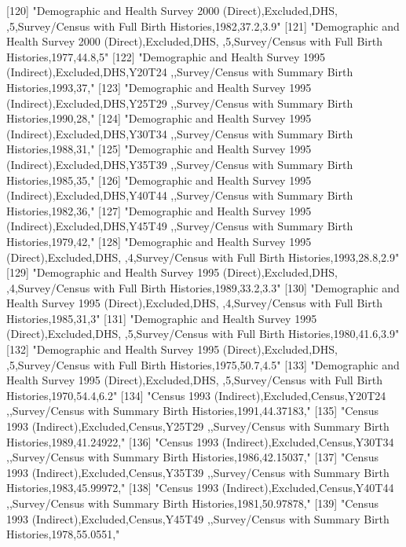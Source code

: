 [120] "Demographic and Health Survey 2000 (Direct),Excluded,DHS, ,5,Survey/Census with Full Birth Histories,1982,37.2,3.9"           
[121] "Demographic and Health Survey 2000 (Direct),Excluded,DHS, ,5,Survey/Census with Full Birth Histories,1977,44.8,5"             
[122] "Demographic and Health Survey 1995 (Indirect),Excluded,DHS,Y20T24 ,,Survey/Census with Summary Birth Histories,1993,37,"      
[123] "Demographic and Health Survey 1995 (Indirect),Excluded,DHS,Y25T29 ,,Survey/Census with Summary Birth Histories,1990,28,"      
[124] "Demographic and Health Survey 1995 (Indirect),Excluded,DHS,Y30T34 ,,Survey/Census with Summary Birth Histories,1988,31,"      
[125] "Demographic and Health Survey 1995 (Indirect),Excluded,DHS,Y35T39 ,,Survey/Census with Summary Birth Histories,1985,35,"      
[126] "Demographic and Health Survey 1995 (Indirect),Excluded,DHS,Y40T44 ,,Survey/Census with Summary Birth Histories,1982,36,"      
[127] "Demographic and Health Survey 1995 (Indirect),Excluded,DHS,Y45T49 ,,Survey/Census with Summary Birth Histories,1979,42,"      
[128] "Demographic and Health Survey 1995 (Direct),Excluded,DHS, ,4,Survey/Census with Full Birth Histories,1993,28.8,2.9"           
[129] "Demographic and Health Survey 1995 (Direct),Excluded,DHS, ,4,Survey/Census with Full Birth Histories,1989,33.2,3.3"           
[130] "Demographic and Health Survey 1995 (Direct),Excluded,DHS, ,4,Survey/Census with Full Birth Histories,1985,31,3"               
[131] "Demographic and Health Survey 1995 (Direct),Excluded,DHS, ,5,Survey/Census with Full Birth Histories,1980,41.6,3.9"           
[132] "Demographic and Health Survey 1995 (Direct),Excluded,DHS, ,5,Survey/Census with Full Birth Histories,1975,50.7,4.5"           
[133] "Demographic and Health Survey 1995 (Direct),Excluded,DHS, ,5,Survey/Census with Full Birth Histories,1970,54.4,6.2"           
[134] "Census 1993 (Indirect),Excluded,Census,Y20T24 ,,Survey/Census with Summary Birth Histories,1991,44.37183,"                    
[135] "Census 1993 (Indirect),Excluded,Census,Y25T29 ,,Survey/Census with Summary Birth Histories,1989,41.24922,"                    
[136] "Census 1993 (Indirect),Excluded,Census,Y30T34 ,,Survey/Census with Summary Birth Histories,1986,42.15037,"                    
[137] "Census 1993 (Indirect),Excluded,Census,Y35T39 ,,Survey/Census with Summary Birth Histories,1983,45.99972,"                    
[138] "Census 1993 (Indirect),Excluded,Census,Y40T44 ,,Survey/Census with Summary Birth Histories,1981,50.97878,"                    
[139] "Census 1993 (Indirect),Excluded,Census,Y45T49 ,,Survey/Census with Summary Birth Histories,1978,55.0551,"                     

